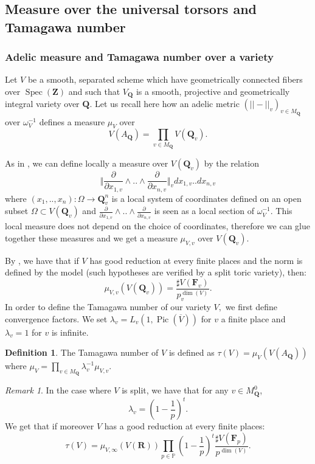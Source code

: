 \documentclass{proc-l}
\newcommand{\R}{\mathbf{R}}
\newcommand{\Z}{\mathbf{Z}}
\newcommand{\Prems}{\mathbb{P}}
\newcommand{\Q}{\mathbf{Q}}
\newcommand{\F}{\mathbf{F}}
\DeclareMathOperator{\Spec}{Spec}
\DeclareMathOperator{\Pic}{Pic}
\newcommand{\w}{\omega}
\theoremstyle{definition}
\newtheorem{definition}[theorem]{Definition}
\theoremstyle{remark}
\newtheorem{remark}[theorem]{Remark}
\numberwithin{equation}{section}
\begin{document}
\subsection{Measure over the universal torsors and Tamagawa number}

\subsubsection{Adelic measure and Tamagawa number  over a variety}

Let $V$ be a smooth, separated scheme which have geometrically connected fibers over $\Spec(\Z)$ and such that $V_{\Q}$ is a smooth, projective and geometrically integral variety over $\Q$. Let us recall here how an adelic metric $(||-||_v)_{v \in M_{\Q}} $ over $\w_{V}^{-1}$ defines a measure $\mu_V$ over $$V(A_{\Q}) = \prod\limits_{v \in M_{\Q}} V(\Q_v).$$ 

As in \cite[2.2.1]{peyre_duke}, we can define locally a measure over $V(\Q_v)$ by the relation $$ \Big\Vert \frac{\partial}{\partial x_{1,v}} \wedge..\wedge \frac{\partial}{\partial x_{n,v}} \Big\Vert_v d x_{1,v} .. d x_{n,v} $$where $(x_1,..,x_n) : \Omega \rightarrow \Q_v^n$ is a local system of coordinates defined on an open subset $\Omega \subset V(\Q_v)$ and $\frac{\partial}{\partial x_{1,v}} \wedge..\wedge \frac{\partial}{\partial x_{n,v}} $ is seen as a local section of $\w_V^{-1}$. This local measure does not depend on the choice of coordinates, therefore we can glue together these measures and we get a measure $\mu_{V,v}$ over $V(\Q_v)$.

By \cite[lemma 2.1.2]{peyre_duke}, we have that if $V$ has good reduction at every finite places and the norm is defined by the model (such hypotheses are verified by a split toric variety), then: $$ \mu_{V,v}(V(\Q_v)) = \frac{\sharp V(\F_v)}{p_v^{\dim(V)}} .$$In order to define
the Tamagawa number of our variety $V,$ we first define convergence factors. We set $\lambda_v = L_v(1,\Pic(\overline{V}))$ for $v$ a finite place and $\lambda_v = 1$ for $v$ is infinite.

\begin{definition}\label{tamaga_number_variety}
    The Tamagawa number of $V$ is defined as $\tau(V) = \mu_V(V(A_{\Q}))$ where $\mu_V = \prod\limits_{v \in M_{\Q}} \lambda_v^{-1} \mu_{V,v}$.
\end{definition}

\begin{remark}\label{tamagawa_number_toric_variety}
    In the case where $V$ is split, we have that for any $v \in M_{\Q}^0$, $$ \lambda_v = \left(1 - \frac{1}{p} \right)^t.$$We get that if moreover $V$ has a good reduction at every finite places:
    $$ \tau(V) = \mu_{V,\infty}(V(\R))  \prod\limits_{p \in \Prems} \left( 1 - \frac{1}{p} \right)^t  \frac{\sharp V(\F_p)}{p^{\dim(V)}} .$$
\end{remark}
\end{document}
